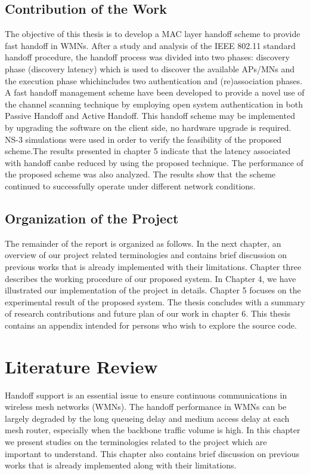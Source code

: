 \documentclass[12pt,a4paper]{report}
\begin{document}
\section{Contribution of the Work}
The objective of this thesis is to develop a MAC layer handoff scheme to provide fast handoff in WMNs. After a study and analysis of the IEEE 802.11 standard handoff procedure, the handoff process was divided into two phases: discovery phase (discovery latency) which is used to discover the available APs/MNs and the execution phase whichincludes two authentication and (re)association phases. A fast handoff management scheme have been developed to provide a novel use of the channel scanning technique by employing open system authentication in both Passive Handoff and Active Handoff. This handoff scheme may be implemented by upgrading the software on the client side, no hardware upgrade is required. NS-3 simulations were used in order to verify the feasibility of the proposed scheme.The results presented in chapter 5 indicate that the latency associated with handoff canbe reduced by using the proposed technique. The performance of the proposed scheme was also analyzed. The results show that the scheme continued to successfully operate under different network conditions.
\section{Organization of the Project}
The remainder of the report is organized as follows. In the next chapter, an overview of our project related terminologies and contains brief discussion on previous works that is already implemented with their limitations. Chapter three describes the working procedure of our proposed system. In Chapter 4, we have illustrated our implementation of the project in details. Chapter 5 focuses on the experimental result of the proposed system. The thesis concludes with a summary of research contributions and future plan of our work in chapter 6. This thesis contains an appendix intended for persons who wish to explore the source code. 
\chapter{Literature Review}
Handoff support is an essential issue to ensure continuous communications in wireless mesh networks (WMNs). The handoff performance in WMNs can be largely degraded by the long queueing delay and medium access delay at each mesh router, especially when the backbone traffic volume is high. In this chapter we present studies on the terminologies related to the project which are important to understand. This chapter also contains brief discussion on previous works that is already implemented along with their limitations.
\end{document}
